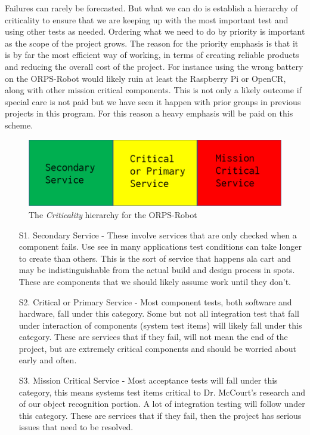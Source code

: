 \documentclass[english,12pt]{article}
\begin{document}
Failures can rarely be forecasted. But what we can do is establish a hierarchy of 
criticality to ensure that we are keeping up with the most important test and using 
other tests as needed. Ordering what we need to do by priority is important as the scope 
of the project grows. The reason for the priority emphasis is that it is by far 
the most efficient way of working, in terms of creating reliable products and reducing 
the overall cost of the project. For instance using the wrong battery on the ORPS-Robot 
would likely ruin at least the Raspberry Pi or OpenCR, along with other mission critical 
components. This is not only a likely outcome if special care is not paid but we have seen it 
happen with prior groups in previous projects in this program. For this reason a heavy emphasis 
will be paid on this scheme.
\begin{figure}[h!]
    \centerline{\includegraphics[width = \textwidth]{crit.jpg}}
    \caption{The \textit{Criticality} hierarchy for the ORPS-Robot}
\end{figure}
\begin{itemize}
    \item[S1.] Secondary Service - These involve services that are only checked when a component 
    fails. Use see in many applications test conditions can take longer to create than others. 
    This is the sort of service that happens ala cart and may be indistinguishable from the actual 
    build and design process in spots. These are components that we should likely assume work until 
    they don't.
    \item[S2.] Critical or Primary Service - Most component tests, both software and hardware, 
    fall under this category. Some but not all integration test that fall under interaction of 
    components (system test items) will likely fall under this category. These are services that 
    if they fail, will not mean the end of the project, but are extremely critical components 
    and should be worried about early and often.
    \item[S3.] Mission Critical Service - Most acceptance tests will fall under this category, this 
    means systems test items critical to Dr. McCourt’s research and of our object recognition 
    portion. A lot of integration testing will follow under this category. These are services 
    that if they fail, then the project has serious issues that need to be resolved.
\end{itemize}
\end{document}
